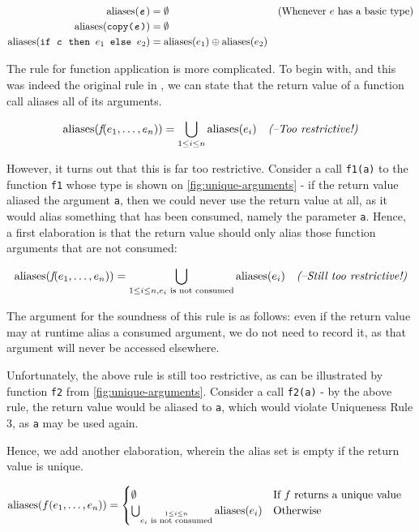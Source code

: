 \begin{align*}
  \textrm{aliases}(\texttt{\textit{e}}) &= \emptyset & (\text{Whenever $e$ has a basic type}) \\
  \textrm{aliases}(\texttt{copy(\textit{e})}) &= \emptyset \\
  \textrm{aliases}(\texttt{if \textit{c} then ${e}_{1}$ else ${e}_{2}$}) &= \textrm{aliases}(e_{1}) \oplus \textrm{aliases}(e_{2}) \\
\end{align*}

The rule for function application is more complicated.  To begin with,
and this was indeed the original rule in \LO{}, we can state that the
return value of a function call aliases all of its arguments.

\begin{align*}
  \textrm{aliases}(\textit{f}(e_{1}, \ldots, e_{n})) &= \bigcup_{1 \leq i \leq n} \textrm{aliases}(e_{i}) & \textit{(--Too restrictive!)}
\end{align*}

However, it turns out that this is far too restrictive.  Consider a
call \texttt{f1(a)} to the function \texttt{f1} whose type is shown on
\cref{fig:unique-arguments} - if the return value aliased the argument
\texttt{a}, then we could never use the return value at all, as it
would alias something that has been consumed, namely the parameter
\texttt{a}.  Hence, a first elaboration is that the return value
should only alias those function arguments that are not consumed:

\begin{align*}
  \textrm{aliases}(\textit{f}(e_{1}, \ldots, e_{n})) &= \bigcup_{1 \leq i \leq n, \text{$e_{i}$ is not consumed}} \textrm{aliases}(e_{i})  & \textit{(--Still too restrictive!)}
\end{align*}

The argument for the soundness of this rule is as follows: even if the
return value may at runtime alias a consumed argument, we do not need
to record it, as that argument will never be accessed elsewhere.

Unfortunately, the above rule is still too restrictive, as can be
illustrated by function \texttt{f2} from \cref{fig:unique-arguments}.
Consider a call \texttt{f2(a)} - by the above rule, the return value
would be aliased to \texttt{a}, which would violate Uniqueness Rule 3,
as \texttt{a} may be used again.

Hence, we add another elaboration, wherein the alias set is empty if
the return value is unique.

\begin{align*}
  \textrm{aliases}(f(e_{1}, \ldots, e_{n})) &=
  \begin{cases}
    \emptyset & \mbox{If $f$ returns a unique value}\\
    \bigcup_{\overset{1 \leq i \leq n}{\text{$e_{i}$ is not consumed}}} \textrm{aliases}(e_{i}) & \mbox{Otherwise}
  \end{cases}
\end{align*}

